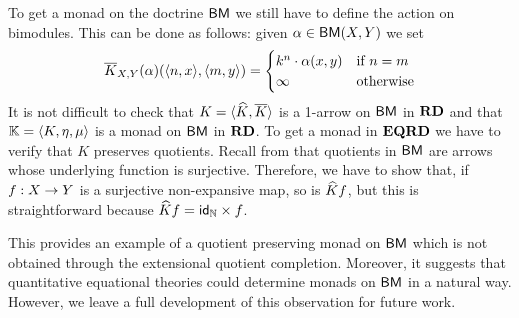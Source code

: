 \begin{example}
To get a monad on the doctrine $\mathsf{BM}$ we still have to define the action on bimodules. 
This can be done  as follows: 
given $\alpha \in \mathsf{BM}(X,Y)$ we set 
\[
\overline{K}_{X,Y}(\alpha)({\langle n,x \rangle },{\langle m,y \rangle }) = 
\begin{cases}
  k^n\cdot \alpha(x,y) & \text{if } n = m \\
  \infty & \text{otherwise} 
\end{cases}
\]
It is not difficult to check that $K = {\langle \widehat{K},\overline{K} \rangle }$ is a 1-arrow on $\mathsf{BM}$ in $\mathbf{RD}$ and that 
$\mathbb{K} = {\langle K,\eta,\mu \rangle }$ is a monad on $\mathsf{BM}$ in $\mathbf{RD}$. 
% 
To get a monad in $\mathbf{EQRD}$ we have to verify that $K$ preserves quotients. 
Recall from  that quotients in $\mathsf{BM}$ are arrows whose underlying function is surjective. 
Therefore, we have to show that, if $\fun{f}{X}{Y}$ is a surjective non-expansive map, so is $\widehat{K}f$, but this is  straightforward because $\widehat{K}f = \mathsf{id}_{\mathbb{N}}\times f$. 

This provides an example of a quotient preserving monad on $\mathsf{BM}$ which is not obtained through  the extensional quotient completion. 
Moreover, it suggests that quantitative equational theories could determine monads on $\mathsf{BM}$ in a natural way. 
However, we leave  a full development of this observation for future work. 

\end{example}



